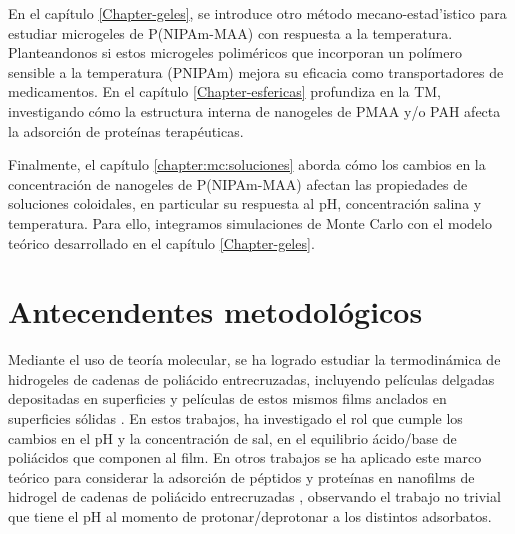 En el cap\'itulo \ref{Chapter-geles}, se introduce otro m\'etodo mecano-estad'istico para estudiar microgeles de P(NIPAm-MAA) con respuesta a la temperatura.
Planteandonos si estos  microgeles polim\'ericos que incorporan un pol\'imero sensible a la temperatura (PNIPAm)  mejora su eficacia como transportadores de medicamentos. En el cap\'itulo \ref{Chapter-esfericas} profundiza en la TM, investigando c\'omo la estructura interna de nanogeles de PMAA y/o PAH afecta la adsorci\'on de prote\'inas terap\'euticas.

Finalmente, el cap\'itulo \ref{chapter:mc:soluciones} aborda c\'omo los cambios en la concentraci\'on de nanogeles de P(NIPAm-MAA) afectan las propiedades de soluciones coloidales, en particular su respuesta al pH, concentraci\'on salina y temperatura. Para ello, integramos simulaciones de Monte Carlo con el modelo te\'orico desarrollado en el  cap\'itulo \ref{Chapter-geles}.


\section{Antecendentes metodol\'ogicos}\label{sec:intro:metodologicos}

Mediante el uso de teor\'ia  molecular, se ha logrado estudiar la termodin\'amica de hidrogeles de cadenas de poli\'acido entrecruzadas, incluyendo pel\'iculas delgadas depositadas en superficies \cite{longo2012molecular,nap2006weak} y pel\'iculas  de estos mismos films anclados en superficies s\'olidas \cite{longo2014non,longo2014equilibrium}.
En estos trabajos, \citet{longo2014equilibrium} ha investigado el rol que cumple los cambios en el pH y la concentraci\'on de sal, en el equilibrio \'acido/base de poli\'acidos que componen al film. En otros trabajos se ha aplicado este marco te\'orico para considerar la adsorci\'on de p\'eptidos y prote\'inas en nanofilms de hidrogel de cadenas de poli\'acido entrecruzadas \cite{longo2014equilibrium,narambuena2015lysozyme,longo2016adsorption,hagemann2018use,szleifer1997protein,fang2005kinetics}, observando el trabajo no trivial que tiene el pH al momento de protonar/deprotonar a los distintos adsorbatos.


